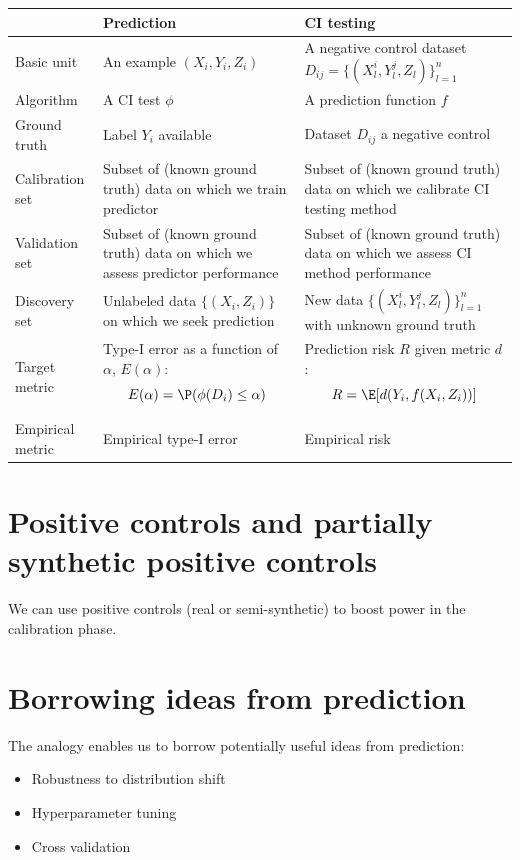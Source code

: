 \documentclass[12pt]{article}
\begin{document}
\begin{tabular}{|p{3cm}|p{5cm}|p{5cm}|}
	\hline 
 	 & Prediction & CI testing \\
 	 \hline 
 	Basic unit & An example $(X_i, Y_i, Z_i)$  & A negative control dataset $D_{ij} = \{ (X^i_l, Y^j_l, Z_l) \}_{l=1}^n$  \\ 
	\hline 
	 Algorithm & A CI test $\phi$ & A prediction function $f$  \\ 
	\hline 
	Ground truth & Label $Y_i$ available & Dataset $D_{ij}$ a negative control \\ 
	\hline 
	Calibration set & Subset of (known ground truth) data on which we train predictor & Subset of (known ground truth) data on which we calibrate CI testing method \\ 
	\hline 
	Validation set &  Subset of (known ground truth) data on which we assess predictor performance &  Subset of (known ground truth) data on which we assess CI method performance \\ 
	\hline 
	Discovery set & Unlabeled data $\{(X_i, Z_i)\}$ on which we seek prediction  & New data $\{ (X^i_l, Y^j_l, Z_l) \}_{l=1}^n$ with unknown ground truth \\ 
	\hline 
	Target metric & Type-I error as a function of $\alpha$, $E(\alpha)$: $$ E(\alpha) = \P( \phi(D_i) \leq \alpha ) $$ & Prediction risk $R$ given metric $d$: $$ R = \E[ d(Y_i, f(X_i, Z_i)) ] $$ \\ 
	\hline 
	Empirical metric & Empirical type-I error  & Empirical risk \\ 
	\hline 
\end{tabular} 

\section{Positive controls and partially synthetic positive controls}

We can use positive controls (real or semi-synthetic) to boost power in the calibration phase.

\section{Borrowing ideas from prediction}

The analogy enables us to borrow potentially useful ideas from prediction:
\begin{itemize}
\item Robustness to distribution shift
\item Hyperparameter tuning
\item Cross validation
\end{itemize}



\end{document}
